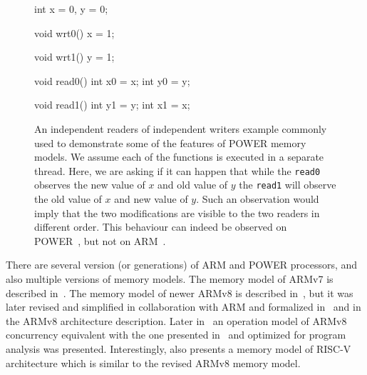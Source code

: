 \begin{figure}[tp]
    \begin{cppcode}
        int x = 0, y = 0;
    \end{cppcode}
    \begin{multicols}{4}
        \begin{cppcode}
          void wrt0()
          {
            x = 1;
          }
        \end{cppcode}
        \columnbreak
        \begin{cppcode}
          void wrt1()
          {
            y = 1;
          }
        \end{cppcode}
        \columnbreak
        \begin{cppcode}
          void read0()
          {
            int x0 = x;
            int y0 = y;
          }
        \end{cppcode}
        \columnbreak
        \begin{cppcode}
          void read1()
          {
            int y1 = y;
            int x1 = x;
          }
        \end{cppcode}
    \end{multicols}
    \caption{
        An independent readers of independent writers example commonly used to
        demonstrate some of the features of POWER memory models.
        We assume each of the functions is executed in a separate thread.
        Here, we are asking if it can happen that while the \texttt{read0}
        observes the new value of $x$ and old value of $y$ the \texttt{read1}
        will observe the old value of $x$ and new value of $y$.
        Such an observation would imply that the two modifications are visible
        to the two readers in different order.
        This behaviour can indeed be observed on POWER~\cite{TODO}, but not on
        ARM~\cite{Pulte2017}.
    }\label{fig:prelim:iriw}
\end{figure}

There are several version (or generations) of ARM and POWER processors, and
also multiple versions of memory models.
The memory model of ARMv7 is described in~.
The memory model of newer ARMv8 is described in~, but it was
later revised and simplified in collaboration with ARM and formalized
in~ and in the ARMv8 architecture description.
Later in~ an operation model of ARMv8 concurrency equivalent
with the one presented in~ and optimized for program analysis
was presented.
Interestingly,  also presents a memory model of RISC-V
architecture which is similar to the revised ARMv8 memory model.

